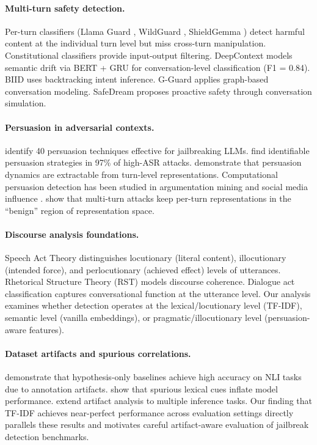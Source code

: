 \documentclass[11pt]{article}
\begin{document}
\paragraph{Multi-turn safety detection.}
Per-turn classifiers (Llama Guard \citep{inan2023llamaguard}, WildGuard \citep{han2024wildguard}, ShieldGemma \citep{zeng2024shieldgemma}) detect harmful content at the individual turn level but miss cross-turn manipulation. Constitutional classifiers \citep{anthropic2024constitutional} provide input-output filtering. DeepContext \citep{su2026deepcontext} models semantic drift via BERT + GRU for conversation-level classification (F1 = 0.84). BIID \citep{biid2025} uses backtracking intent inference. G-Guard \citep{gguard2025} applies graph-based conversation modeling. SafeDream \citep{safedream2025} proposes proactive safety through conversation simulation.

\paragraph{Persuasion in adversarial contexts.}
\citet{zeng2024persuasion} identify 40 persuasion techniques effective for jailbreaking LLMs. \citet{hagendorff2026persuasion} find identifiable persuasion strategies in 97\% of high-ASR attacks. \citet{howdollms2025} demonstrate that persuasion dynamics are extractable from turn-level representations. Computational persuasion detection has been studied in argumentation mining \citep{habernal2016argumentation} and social media influence \citep{tan2016winning}. \citet{bullwinkel2025} show that multi-turn attacks keep per-turn representations in the ``benign'' region of representation space.

\paragraph{Discourse analysis foundations.}
Speech Act Theory \citep{austin1962,searle1969} distinguishes locutionary (literal content), illocutionary (intended force), and perlocutionary (achieved effect) levels of utterances. Rhetorical Structure Theory (RST) \citep{mann1988rst} models discourse coherence. Dialogue act classification \citep{stolcke2000dialogue} captures conversational function at the utterance level. Our analysis examines whether detection operates at the lexical/locutionary level (TF-IDF), semantic level (vanilla embeddings), or pragmatic/illocutionary level (persuasion-aware features).

\paragraph{Dataset artifacts and spurious correlations.}
\citet{gururangan2018annotation} demonstrate that hypothesis-only baselines achieve high accuracy on NLI tasks due to annotation artifacts. \citet{niven2019probing} show that spurious lexical cues inflate model performance. \citet{poliak2018hypothesis} extend artifact analysis to multiple inference tasks. Our finding that TF-IDF achieves near-perfect performance across evaluation settings directly parallels these results and motivates careful artifact-aware evaluation of jailbreak detection benchmarks.
\end{document}

